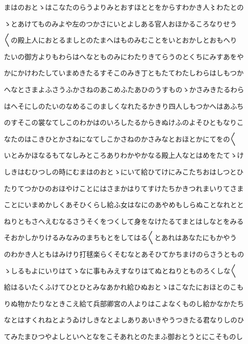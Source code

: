 \documentclass[a4paper,11pt,landscape]{ltjtarticle}
\begin{document}
\par\medskip
まはのおとゝはこなたのらうよりみとおすほととをからすわかき人〻わたとの
\par\medskip
ゝとあけてものみよや左のつかさにいとよしある官人おほかるころなりせう
\par\medskip
〱の殿上人におとるましとのたまへはものみむことをいとおかしとおもへり
\par\medskip
たいの御方よりもわらはへなとものみにわたりきてらうのとくちにみすあをや
\par\medskip
かにかけわたしていまめきたるすそこのみき丁ともたてわたしわらはしもつか
\par\medskip
へなとさまよふさうふかさねのあこめふたあひのうすものゝかさみきたるわら
\par\medskip
はへそにしのたいのなめるこのましくなれたるかきり四人しもつかへはあふち
\par\medskip
のすそこの裳なてしこのわかはのいろしたるからきぬけふのよそひともなりこ
\par\medskip
なたのはこきひとかさねになてしこかさねのかさみなとおほとかにてをの〱
\par\medskip
いとみかほなるもてなしみところありわかやかなる殿上人なとはめをたてゝけ
\par\medskip
しきはむひつしの時にむまはのおとゝにいて給ひてけにみこたちおはしつとひ
\par\medskip
たりてつかひのおほやけことにはさまかはりてすけたちかきつれまいりてさま
\par\medskip
ことにいまめかしくあそひくらし給ふ女はなにのあやめもしらぬことなれとと
\par\medskip
ねりともさへえむなるさうそくをつくして身をなけたるてまとはしなとをみる
\par\medskip
そおかしかりけるみなみのまちもとをしてはる〱とあれはあなたにもかやう
\par\medskip
のわかき人ともはみけり打毬楽らくそむなとあそひてかちまけのらさうともの
\par\medskip
ゝしるもよにいりはてゝなに事もみえすなりはてぬとねりとものろくしな〱
\par\medskip
給はるいたくふけてひとひとみなあかれ給ひぬおとゝはこなたにおほとのこも
\par\medskip
りぬ物かたりなときこえ給て兵部卿宮の人よりはこよなくものし給かなかたち
\par\medskip
なとはすくれねとようゐけしきなとよしありあいきやうつきたる君なりしのひ
\par\medskip
てみたまひつやよしといへとなをこそあれとのたまふ御おとうとにこそものし
\par\medskip
\end{document}
